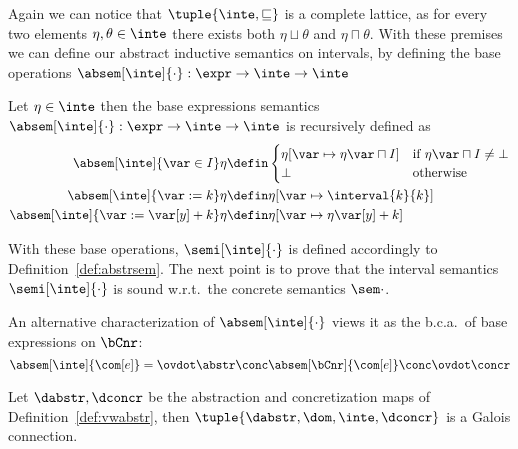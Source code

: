 Again we can notice that \(\tuple{\inte, \sqsubseteq}\) is a complete
lattice, as for every two elements \(\eta,\theta\in\inte\) there
exists both \(\eta \sqcup \theta\) and \(\eta \sqcap \theta\).  With
these premises we can define our abstract inductive semantics on
intervals, by defining the base operations
\(\absem[\inte]{\cdot} : \expr \to \inte \to \inte\)

\begin{definition}
  Let \(\eta \in \inte\) then the base expressions semantics
  \(\absem[\inte]{\cdot} : \expr \to \inte \to \inte\) is recursively
  defined as
  \begin{align*}
    \absem[\inte]{\var\in I}\eta & \defin
                                   \begin{cases}
                                     \eta[\var\mapsto\eta\var\sqcap I] & \text{if } \eta\var\sqcap I \neq \bot \\
                                     \bot & \text{otherwise}
                                   \end{cases} \\
    \absem[\inte]{\var := k}\eta & \defin \eta[\var\mapsto\interval{k}{k}] \\
    \absem[\inte]{\var := \var[y] + k}\eta & \defin \eta[\var\mapsto \eta\var[y] + k] \\
  \end{align*}
\end{definition}
With these base operations, \(\semi[\inte]{\cdot}\) is defined
accordingly to Definition~\ref{def:abstrsem}.  The next point is to
prove that the interval semantics \(\semi[\inte]{\cdot}\) is sound
w.r.t.\ the concrete semantics \(\sem\cdot\).

\begin{observation}\label{obs:alternative}
  An alternative characterization of \(\absem[\inte]{\cdot}\) views it
  as the b.c.a.\ of base expressions on \(\bCnr\):
  \begin{equation*}
    \absem[\inte]{\com[e]} = \ovdot\abstr \conc \absem[\bCnr]{\com[e]} \conc \ovdot\concr
  \end{equation*}
\end{observation}

\begin{lemma}
  Let \(\dabstr, \dconcr\) be the abstraction and concretization maps
  of Definition~\ref{def:vwabstr}, then
  \(\tuple{\dabstr, \dom, \inte, \dconcr}\) is a Galois connection.
\end{lemma}


